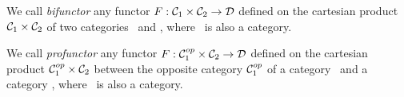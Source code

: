 \begin{defin}\label{Fun:def:bifunctor}
    We call {\em bifunctor} any functor $F:\mbox{${\cal C}_{1}$}\times\mbox{${\cal C}_{2}$}\to\mbox{$\cal D$}$ defined
    on the cartesian product $\mbox{${\cal C}_{1}$}\times\mbox{${\cal C}_{2}$}$ of two categories \Cone\ and
    \Ctwo, where \Dat\ is also a category.
\end{defin}

\begin{defin}\label{Fun:def:profunctor}
    We call {\em profunctor} any functor $F:\mbox{${\cal C}_{1}^{op}$}\times\mbox{${\cal C}_{2}$}\to\mbox{$\cal D$}$ defined
    on the cartesian product $\mbox{${\cal C}_{1}^{op}$}\times\mbox{${\cal C}_{2}$}$ between the opposite 
    category $\mbox{${\cal C}_{1}^{op}$}$ of a category \Cone\ and a category \Ctwo, 
    where \Dat\ is also a category.
\end{defin}
